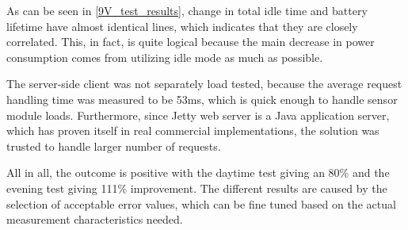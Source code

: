 As can be seen in \autoref{9V_test_results}, change in total idle time and battery lifetime have almost identical lines, which indicates that they are closely correlated. This, in fact, is quite logical because the main decrease in power consumption comes from utilizing idle mode as much as possible. 

The server-side client was not separately load tested, because the average request handling time was measured to be 53ms, which is quick enough to handle sensor module loads. Furthermore, since Jetty web server is a Java application server, which has proven itself in real commercial implementations, the solution was trusted to handle larger number of requests.

All in all, the outcome is positive with the daytime test giving an 80\% and the evening test giving 111\% improvement. The different results are caused by the selection of acceptable error values, which can be fine tuned based on the actual measurement characteristics needed. 


